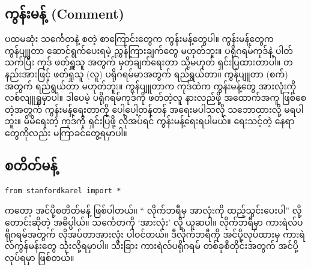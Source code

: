 \subsection*{ကွန်းမန့် (Comment)}
ပထမဆုံး \fCode{\textit{\#}} သင်္ကေတနဲ့ စတဲ့ စာကြောင်းတွေက ကွန်းမန့်တွေပါ။ ကွန်းမန့်တွေက ကွန်ပျူတာ ဆောင်ရွက်ပေးရမဲ့ ညွှန်ကြားချက်တွေ မဟုတ်ဘူး။ ပရိုဂရမ်ကုဒ်နဲ့ ပါတ်သက်ပြီး ကုဒ် ဖတ်ရှူသူ အတွက် မှတ်ချက်ရေးတာ သို့မဟုတ် ရှင်းပြထားတာပါ။ တနည်းအားဖြင့် ဖတ်ရှုသူ (လူ) ပရိုဂရမ်မာအတွက် ရည်ရွယ်တာ။ ကွန်ပျူတာ (စက်) အတွက် ရည်ရွယ်တာ မဟုတ်ဘူး။ ကွန်ပျူတာက ကုဒ်ထဲက ကွန်းမန့်တွေ အားလုံးကို လစ်လျူရှုမှာပါ။ ဒါပေမဲ့ ပရိုဂရမ်ကုဒ်ကို ဖတ်တဲ့လူ နားလည်ဖို့ အထောက်အကူ ဖြစ်စေတဲ့အတွက် ကွန်းမန့်ရေးတာကို ပေါ့ပေါ့တန်တန် အရေးမပါသလို သဘောထားလို့ မရပါဘူး။ မိမိရေးတဲ့ ကုဒ်ကို ရှင်းပြဖို့ လိုအပ်ရင် ကွန်းမန့်ရေးရပါမယ်။ ရေးသင့်တဲ့ နေရာတွေကိုလည်း မကြာခင်တွေ့ရမှာပါ။

\subsection*{ စတိတ်မန့်}
%
\setlength{\fboxsep}{0pt}
\begin{verbatim}
from stanfordkarel import *
\end{verbatim}
%
ကတော့ အင်ပို့စတိတ်မန့် ဖြစ်ပါတယ်။ “ လိုက်ဘရီမှ အာလုံးကို ထည့်သွင်းပေးပါ” လို့ တောင်းဆိုတဲ့ အဓိပ္ပါယ်။ \fCode{*} သင်္ကေတကို ‘အားလုံး’ လို့ ယူဆပါ။   လိုက်ဘရီမှာ ကားရဲလ်ပရိုဂရမ်အတွက် လိုအပ်တာအားလုံး   ပါဝင်တယ်။  ဒီလိုက်ဘရီကို အင်ပို့လုပ်ထားမှ ကားရဲလ်ကွန်မန်းတွေ သုံးလို့ရမှာပါ။ သီးခြား ကားရဲလ်ပရိုဂရမ် တစ်ခုစီတိုင်းအတွက် အင်ပို့လုပ်ရမှာ ဖြစ်တယ်။

